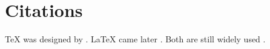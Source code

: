 \documentclass{article}
\begin{document}
\section{Citations}

TeX was designed by \citet{knuth1984}. \LaTeX{} came later \citep{lamport1994}.
Both are still widely used \citep[see][chap.~1]{knuth1984, lamport1994}.



\end{document}
